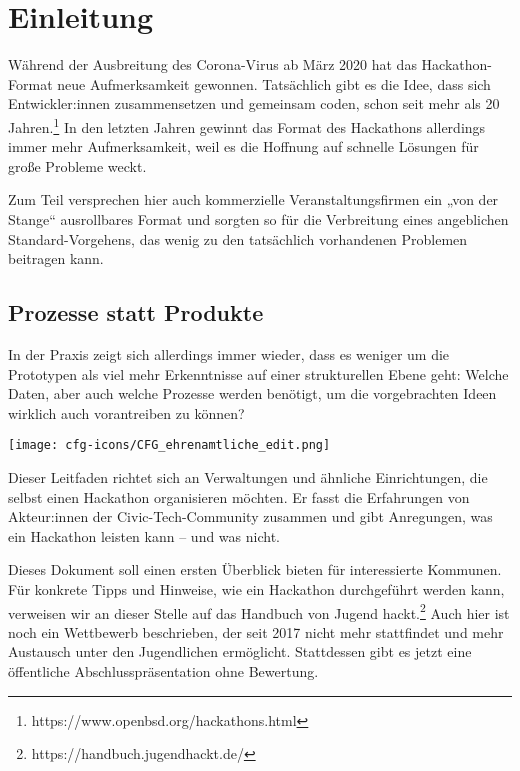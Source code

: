 

\setchapterpreamble[u]{\margintoc}
\chapter{Einleitung}


Während der Ausbreitung des Corona-Virus ab März 2020 hat das Ha\-cka\-thon-Format neue Aufmerksamkeit gewonnen. Tatsächlich gibt es die Idee, dass sich Entwickler:innen zusammensetzen und gemeinsam coden, schon seit mehr als 20 Jahren.\footnote{https://www.openbsd.org/hackathons.html} In den letzten Jahren gewinnt das Format des Hackathons allerdings immer mehr Aufmerksamkeit, weil es die Hoffnung auf schnelle Lösungen für große Probleme weckt.

Zum Teil versprechen hier auch kommerzielle Veranstaltungsfirmen ein „von der Stange“ ausrollbares Format und sorgten so für die Verbreitung eines angeblichen Standard-Vorgehens, das wenig zu den tatsächlich vorhandenen Problemen beitragen kann.

\section*{Prozesse statt Produkte}

In der Praxis zeigt sich allerdings immer wieder, dass es weniger um die Prototypen als viel mehr Erkenntnisse auf einer strukturellen Ebene geht: Welche Daten, aber auch welche Prozesse werden benötigt, um die vorgebrachten Ideen wirklich auch vorantreiben zu können?

\begin{marginfigure}[-0.5cm]
	\texttt{[image: cfg-icons/CFG\_ehrenamtliche\_edit.png]}
\end{marginfigure}

Dieser Leitfaden richtet sich an Verwaltungen und ähnliche Einrichtungen, die selbst einen Hackathon organisieren möchten. Er fasst die Erfahrungen von Akteur:innen der Civic-Tech-Community zusammen und gibt Anregungen, was ein Hackathon leisten kann – und was nicht.

Dieses Dokument soll einen ersten Überblick bieten für interessierte Kommunen. Für konkrete Tipps und Hinweise, wie ein Hackathon durchgeführt werden kann, verweisen wir an dieser Stelle auf das Handbuch von Jugend hackt.\footnote{https://handbuch.jugendhackt.de/} Auch hier ist noch ein Wettbewerb beschrieben, der seit 2017 nicht mehr stattfindet und mehr Austausch unter den Jugendlichen ermöglicht. Stattdessen gibt es jetzt eine öffentliche Abschlusspräsentation ohne Bewertung.

